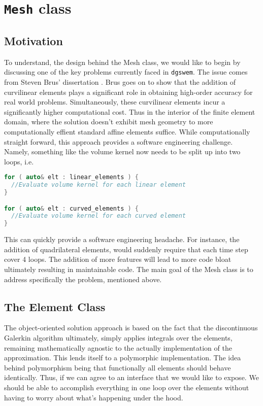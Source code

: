 \chapter{\texttt{Mesh} class}

\section{Motivation}
To understand, the design behind the Mesh class, we would like to begin by discussing one of the key problems currently faced in \texttt{dgswem}. The issue comes from Steven Brus' dissertation \cite{brusDiss}. Brus goes on to show that the addition of curvilinear elements plays a significant role in obtaining high-order accuracy for real world problems. Simultaneously, these curvilinear elements incur a significantly higher computational cost. Thus in the interior of the finite element domain, where the solution doesn't exhibit mesh geometry to more computationally effient standard affine elements suffice. While computationally straight forward, this approach provides a software engineering challenge. Namely, something like the volume kernel now needs to be split up into two loops, i.e.
\begin{lstlisting}[language=c++, caption={Na\"ive implementation of curved and linear finite element kernel}, label=lst:badloops]
for ( auto& elt : linear_elements ) {
  //Evaluate volume kernel for each linear element
}

for ( auto& elt : curved_elements ) {
  //Evaluate volume kernel for each curved element
}
\end{lstlisting}
This can quickly provide a software engineering headache. For instance, the addition of quadrilateral elements, would suddenly require that each time step cover 4 loops. The addition of more features will lead to more code bloat ultimately resulting in maintainable code. The main goal of the Mesh class is to address specifically the problem, mentioned above.

\section{The Element Class}
The object-oriented solution approach is based on the fact that the discontinuous Galerkin algorithm ultimately, simply applies integrals over the elements, remaining mathematically agnostic to the actually implementation of the approximation. This lends itself to a polymorphic implementation. The idea behind polymorphism being that functionally all elements should behave identically. Thus, if we can agree to an interface that we would like to expose. We should be able to accomplish everything in one loop over the elements without having to worry about what's happening under the hood.


